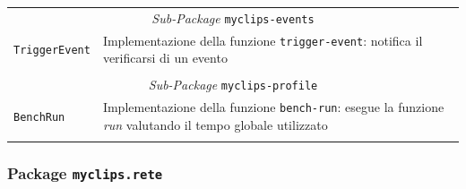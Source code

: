 \begin{longtable}{p{3.5cm}p{8.5cm}}
\multicolumn{2}{c}{\emph{Sub-Package} \texttt{myclips-events}}\\
	\hdashline[5pt/5pt]
		\texttt{TriggerEvent} & Implementazione della funzione \texttt{trigger-event}: notifica il verificarsi di un evento\\ 
	\hline\\

\multicolumn{2}{c}{\emph{Sub-Package} \texttt{myclips-profile}}\\
	\hdashline[5pt/5pt]
		\texttt{BenchRun} & Implementazione della funzione \texttt{bench-run}: esegue la funzione \emph{run} valutando il tempo globale utilizzato\\ 
	\hline\\
	
\end{longtable}


\subsubsection{Package \texttt{myclips.rete}}

